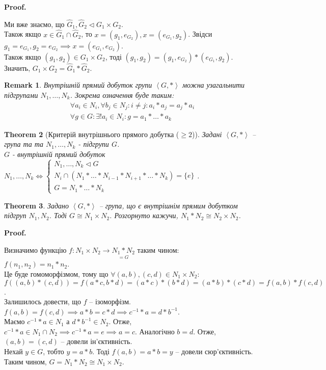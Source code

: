 \documentclass[a4paper, 10pt]{article}
\makeatletter
\theoremstyle{theoremdd}
\newtheorem{theorem}{Theorem}[subsection]
\theoremstyle{theoremdd}
\theoremstyle{theoremdd}
\theoremstyle{theoremdd}
\theoremstyle{theoremdd}
\theoremstyle{theoremdd}
\theoremstyle{theoremdd}
\theoremstyle{theoremdd}
\theoremstyle{theoremdd}
\theoremstyle{theoremdd}
\theoremstyle{theoremdd}
\newtheorem{remark}[theorem]{Remark}
\theoremstyle{theoremdd}
\theoremstyle{theoremdd}
\theoremstyle{theoremdd}
\theoremstyle{theoremdd}
\renewenvironment{proof}[1][Proof.\\]{\par
\pushQED{\hfill \qed}%
\normalfont \topsep6\p@\@plus6\p@\relax
\trivlist
\item\relax
{\bfseries
#1\@addpunct{.}}\hspace\labelsep\ignorespaces
}{%
\popQED\endtrivlist\@endpefalse
}
\makeatother
\begin{document}
\begin{proof}
Ми вже знаємо, що $\hat{G}_1, \hat{G}_2 \triangleleft G_1 \times G_2$.\\
Також якщо $x \in \hat{G}_1 \cap \hat{G}_2$, то $x = (g_1,e_{G_2}), x = (e_{G_1},g_2)$. Звідси $g_1 = e_{G_1}, g_2 = e_{G_2} \implies x = (e_{G_1},e_{G_2})$.\\
Також якщо $(g_1,g_2) \in G_1 \times G_2$, тоді $(g_1,g_2) = (g_1,e_{G_2})*(e_{G_1},g_2)$. Значить, $G_1 \times G_2 = \hat{G}_1 * \hat{G}_2$.
\end{proof}

\begin{remark}
Внутрішній прямий добуток групи $\left< G, *\right>$ можна узагальнити підгрупами $N_1,\dots,N_k$. Зокрема означення буде таким:
\begin{align*}
\forall a_i \in N_i, \forall b_j \in N_j: i \neq j: a_i*a_j = a_j*a_i \\
\forall g \in G: \exists !a_i \in N_i: g = a_1 * \dots * a_k
\end{align*}
\end{remark}

\begin{theorem}[Критерій внутрішнього прямого добутка ($\geq 2$)]
Задані $\left<G, *\right>$  -- група та та $N_1,\dots,N_k$ - підгрупи $G$.\\
$G$ - внутрішній прямий добуток $N_1,\dots,N_k \iff \begin{cases} N_1, \dots, N_k \triangleleft G \\ N_i \cap (N_1*\dots*N_{i-1}*N_{i+1}*\dots*N_k) = \{e\} \\ G = N_1*\dots*N_k \end{cases}$.
\end{theorem}

\begin{theorem}
Задано $\left< G, *\right>$ -- група, що є внутрішнім прямим добутком підгруп $N_1,N_2$. Тоді $G \cong N_1 \times N_2$. Розгорнуто кажучи, $N_1 * N_2 \cong N_2 \times N_2$.
\end{theorem}

\begin{proof}
Визначимо функцію $f \colon N_1 \times N_2 \to \underset{=G}{N_1*N_2}$ таким чином:\\
$f(n_1,n_2) = n_1*n_2$.\\
Це буде гомоморфізмом, тому що $\forall (a,b),(c,d) \in N_1 \times N_2:$\\
$f((a,b)*(c,d)) = f(a*c,b*d) = (a*c)*(b*d) = (a*b)*(c*d) = f(a,b)*f(c,d)$.\\
Залишилось довести, що $f$ -- ізоморфізм.\\
$f(a,b)=f(c,d) \implies a*b = c*d \implies c^{-1}*a = d*b^{-1} $.\\
Маємо $c^{-1}*a \in N_1$ а $d*b^{-1} \in N_2$. Отже, $c^{-1}*a \in N_1 \cap N_2 \implies c^{-1}*a=e \implies a = c$. Аналогічно $b = d$. Отже, $(a,b) = (c,d)$ -- довели ін'єктивність.\\
Нехай $y \in G$, тобто $y = a*b$. Тоді $f(a,b) = a*b = y$ -- довели сюр'єктивність.\\
Таким чином, $G = N_1 * N_2 \cong N_1 \times N_2$.
\end{proof}
\end{document}

